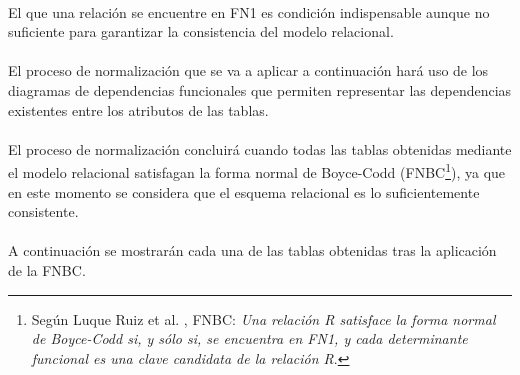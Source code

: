   \paragraph{}El que una relación se encuentre en FN1 es condición
  indispensable aunque no suficiente para garantizar la consistencia del
  modelo relacional.

  \paragraph{}El proceso de normalización que se va a aplicar a continuación
  hará uso de los diagramas de dependencias funcionales que permiten
  representar las dependencias existentes entre los atributos de las
  tablas.

  \paragraph{}El proceso de normalización concluirá cuando todas las tablas
  obtenidas mediante el modelo relacional satisfagan la forma normal
  de Boyce-Codd (FNBC\footnote{Según Luque Ruiz et al. \cite{luqueRuiz}, FNBC:
  \textit{Una relación R satisface la forma
  normal de Boyce-Codd si, y sólo si, se encuentra en FN1, y cada determinante
  funcional es una clave candidata de la relación R}.}), ya que en este momento
  se considera que el esquema relacional es lo suficientemente consistente.

  \paragraph{}A continuación se mostrarán cada una de las tablas obtenidas
  tras la aplicación de la FNBC.





















